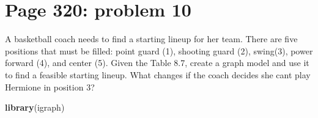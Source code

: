 \documentclass[]{article}
\newenvironment{Shaded}{\begin{snugshade}}{\end{snugshade}}
\newcommand{\KeywordTok}[1]{\textcolor[rgb]{0.13,0.29,0.53}{\textbf{{#1}}}}
\newcommand{\NormalTok}[1]{{#1}}
\begin{document}
\newpage

\section{Page 320: problem 10}\label{page-320-problem-10}

A basketball coach needs to find a starting lineup for her team. There
are five positions that must be filled: point guard (1), shooting guard
(2), swing(3), power forward (4), and center (5). Given the Table 8.7,
create a graph model and use it to find a feasible starting lineup. What
changes if the coach decides she cant play Hermione in position 3?

\begin{Shaded}
\begin{Highlighting}[]
\KeywordTok{library}\NormalTok{(igraph)}
\end{Highlighting}
\end{Shaded}
\end{document}
